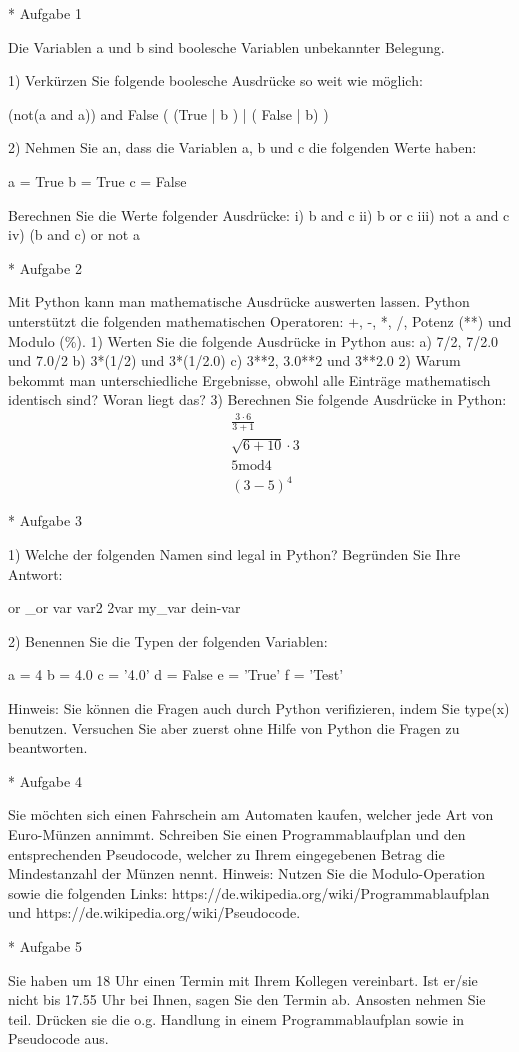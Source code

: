 * Aufgabe 1

Die Variablen a und b sind boolesche Variablen unbekannter Belegung. 

1) Verkürzen Sie folgende boolesche Ausdrücke so weit wie möglich: 

 (not(a and a)) and False
 ( (True | b ) | ( False | b) )
 
2) Nehmen Sie an, dass die Variablen a, b und c die folgenden Werte haben: 
 
 a = True
 b = True
 c = False
 
Berechnen Sie die Werte folgender Ausdrücke:
i) b and c
ii) b or c
iii) not a and c
iv) (b and c) or not a

* Aufgabe 2

Mit Python kann man mathematische Ausdrücke auswerten lassen. Python unterstützt die folgenden mathematischen Operatoren: +, -, *, /, Potenz (**) und Modulo (\%).   
1) Werten Sie die folgende Ausdrücke in Python aus: 
a) 7/2, 7/2.0 und 7.0/2
b) 3*(1/2) und 3*(1/2.0)
c) 3**2, 3.0**2 und 3**2.0
2) Warum bekommt man unterschiedliche Ergebnisse, obwohl alle Einträge mathematisch identisch sind? Woran liegt das?
3) Berechnen Sie folgende Ausdrücke in Python: 
\begin{align}
&\frac{3 \cdot 6}{3 + 1}\\
&\sqrt{6+10} \cdot 3 \\
&5 \text{mod} 4 \\
&(3-5)^4
\end{align}

* Aufgabe 3

1) Welche der folgenden Namen sind legal in Python? Begründen Sie Ihre Antwort: 

or
_or
var
var2
2var
my_var
dein-var

2) Benennen Sie die Typen der folgenden Variablen:

a = 4
b = 4.0
c = '4.0'
d = False
e = 'True'
f = 'Test'

Hinweis: Sie können die Fragen auch durch Python verifizieren, indem Sie type(x) benutzen. Versuchen Sie aber zuerst ohne Hilfe von Python die Fragen zu beantworten.   

* Aufgabe 4

Sie möchten sich einen Fahrschein am Automaten kaufen, welcher jede Art von Euro-Münzen annimmt. Schreiben Sie einen Programmablaufplan und den entsprechenden Pseudocode, welcher zu Ihrem eingegebenen Betrag die Mindestanzahl der Münzen nennt. 
Hinweis: Nutzen Sie die Modulo-Operation sowie die folgenden Links: https://de.wikipedia.org/wiki/Programmablaufplan und https://de.wikipedia.org/wiki/Pseudocode.

* Aufgabe 5

Sie haben um 18 Uhr einen Termin mit Ihrem Kollegen vereinbart. Ist er/sie nicht bis 17.55 Uhr bei Ihnen, sagen Sie den Termin ab. Ansosten nehmen Sie teil. Drücken sie die o.g. Handlung in einem Programmablaufplan sowie in Pseudocode aus.

